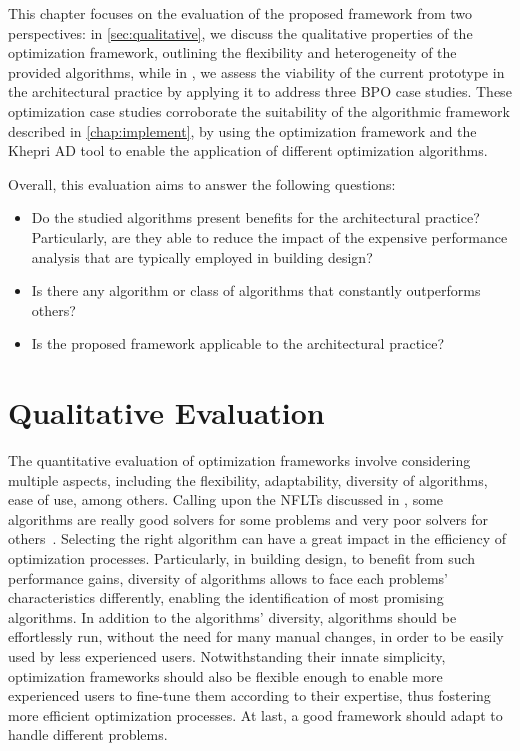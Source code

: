 \label{chap:evaluation}
 
This chapter focuses on the evaluation of the proposed framework from two perspectives: in \cref{sec:qualitative}, we discuss the qualitative properties of the optimization framework, outlining the flexibility and heterogeneity of the provided algorithms, while in , we assess the viability of the current prototype in the architectural practice by applying it to address three \ac{BPO} case studies. These optimization case studies corroborate the suitability of the algorithmic framework described in \cref{chap:implement}, by using the optimization framework and the Khepri \ac{AD} tool to enable the application of different optimization algorithms. 

Overall, this evaluation aims to answer the following questions: 
\begin{itemize}
	\item Do the studied algorithms present benefits for the architectural practice? Particularly, are they able to reduce the impact of the expensive performance analysis that are typically employed in building design?
	\item Is there any algorithm or class of algorithms that constantly outperforms others?
	\item Is the proposed framework applicable to the architectural practice? 
\end{itemize}

\section{Qualitative Evaluation}
\label{sec:qualitative}
The quantitative evaluation of optimization frameworks involve considering multiple aspects, including the flexibility, adaptability, diversity of algorithms, ease of use, among others. Calling upon the \acp{NFLT} discussed in , some algorithms are really good solvers for some problems and very poor solvers for others~\cite{Wolpert1997NFLT}. Selecting the right algorithm can have a great impact in the efficiency of optimization processes. Particularly, in building design, to benefit from such performance gains, diversity of algorithms allows to face each problems' characteristics differently, enabling the identification of most promising algorithms. In addition to the algorithms' diversity, algorithms should be effortlessly run, without the need for many manual changes, in order to be easily used by less experienced users. Notwithstanding their innate simplicity, optimization frameworks should also be flexible enough to enable more experienced users to fine-tune them according to their expertise, thus fostering more efficient optimization processes. At last, a good framework should adapt to handle different problems.

